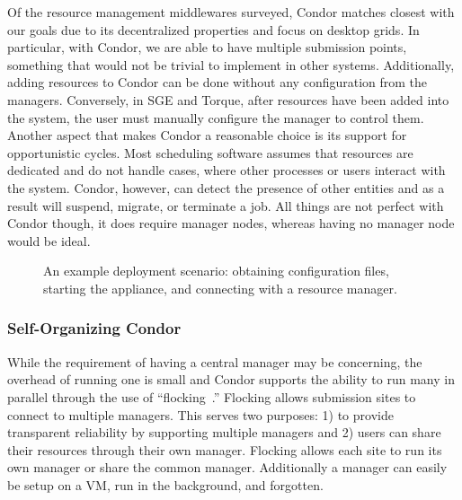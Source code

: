 \documentclass[conference]{IEEEtran}
\begin{document}
Of the resource management middlewares surveyed, Condor matches closest with
our goals due to its decentralized properties and focus on desktop grids.  In
particular, with Condor, we are able to have multiple submission points,
something that would not be trivial to implement in other systems.
Additionally, adding resources to Condor can be done without any configuration
from the managers.  Conversely, in SGE and Torque, after resources have been
added into the system, the user must manually configure the manager to control
them.  Another aspect that makes Condor a reasonable choice is its support for
opportunistic cycles.  Most scheduling software assumes that resources are
dedicated and do not handle cases, where other processes or users interact with
the system.  Condor, however, can detect the presence of other entities and as
a result will suspend, migrate, or terminate a job.  All things are not perfect
with Condor though, it does require manager nodes, whereas having no manager
node would be ideal.

\begin{figure}[ht]
\centering
{}
\caption{An example deployment scenario:  obtaining configuration files,
starting the appliance, and connecting with a resource manager.}
\label{fig:system}
\end{figure}

\addtocounter{footnote}{1}
\addtocounter{footnote}{1}
\addtocounter{footnote}{1}

\subsubsection{Self-Organizing Condor}

While the requirement of having a central manager may be concerning, the
overhead of running one is small and Condor supports the ability to run many in
parallel through the use of ``flocking~\cite{flocking}.'' Flocking allows
submission sites to connect to multiple managers.  This serves two purposes: 1)
to provide transparent reliability by supporting multiple managers and 2) users
can share their resources through their own manager.  Flocking allows each site
to run its own manager or share the common manager.  Additionally a manager can
easily be setup on a VM, run in the background, and forgotten.
\end{document}
